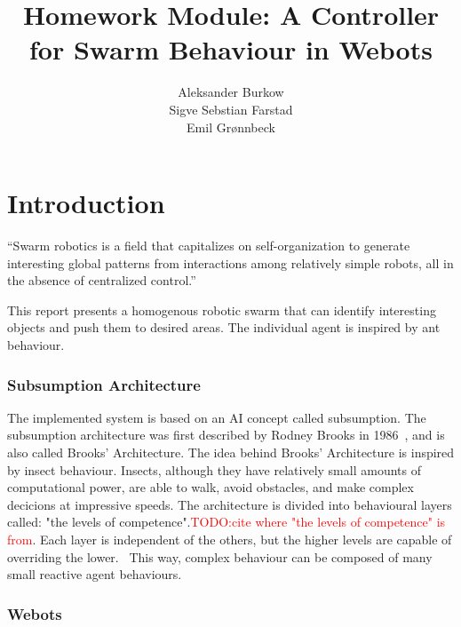 \documentclass[a4paper]{article}
\title{Homework Module: A Controller for Swarm Behaviour in Webots}
\author{
    Aleksander Burkow \\
    Sigve Sebstian Farstad \\
    Emil Grønnbeck
}
\newcommand\TODO[1]{\textcolor{red}{TODO:#1}}
\newcommand\todo[1]{\TODO{#1}}
\begin{document}

\maketitle
\thispagestyle{empty}


\newpage

\tableofcontents

\newpage
\setcounter{page}{1}

\part{Introduction}

``Swarm robotics is a field that capitalizes on self-organization to generate interesting global patterns from interactions among relatively simple robots, all in the absence of centralized control.''~\cite{course-page}

This report presents a homogenous robotic swarm that can identify interesting objects and push them to desired areas.
The individual agent is inspired by ant behaviour.



\section{Subsumption Architecture}
The implemented system is based on an AI concept called subsumption.
The subsumption architecture was first described by Rodney Brooks in 1986~\cite{brooks}, and is also called Brooks' Architecture.
The idea behind Brooks' Architecture is inspired by insect behaviour.
Insects, although they have relatively small amounts of computational power, are able to walk, avoid obstacles, and make complex decicions at impressive speeds.
The architecture is divided into behavioural layers called: "the levels of competence".\todo{cite where "the levels of competence" is from}.
Each layer is independent of the others, but the higher levels are capable of overriding the lower.~\cite{mwarnerwu}
This way, complex behaviour can be composed of many small reactive agent behaviours.

\section{Webots}
\end{document}
